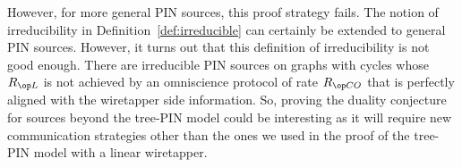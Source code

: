 However, for more general PIN sources, this proof strategy fails. The notion of irreducibility in Definition~\ref{def:irreducible} can certainly be extended to general PIN sources. However, it turns out that this definition of irreducibility is not good enough. There are irreducible PIN sources on graphs with cycles whose $\rl$ is not achieved by an omniscience protocol of rate $\rco$ that is perfectly aligned with the wiretapper side information. So, proving the duality conjecture for sources beyond the tree-PIN model could be interesting as it will require new communication strategies other than the ones we used in the proof of the tree-PIN model with a linear wiretapper.  